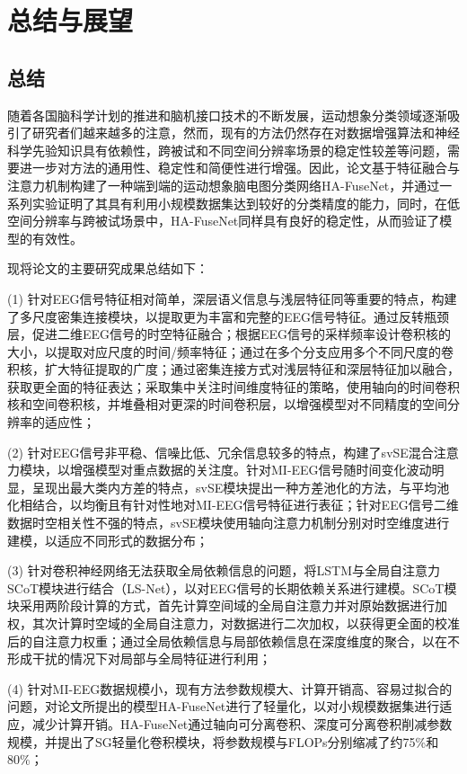 
\chapter{总结与展望}

\section{总结}

随着各国脑科学计划的推进和脑机接口技术的不断发展，运动想象分类领域逐渐吸引了研究者们越来越多的注意，然而，现有的方法仍然存在对数据增强算法和神经科学先验知识具有依赖性，跨被试和不同空间分辨率场景的稳定性较差等问题，需要进一步对方法的通用性、稳定性和简便性进行增强。因此，论文基于特征融合与注意力机制构建了一种端到端的运动想象脑电图分类网络HA-FuseNet，并通过一系列实验证明了其具有利用小规模数据集达到较好的分类精度的能力，同时，在低空间分辨率与跨被试场景中，HA-FuseNet同样具有良好的稳定性，从而验证了模型的有效性。

现将论文的主要研究成果总结如下：

(1) 针对EEG信号特征相对简单，深层语义信息与浅层特征同等重要的特点，构建了多尺度密集连接模块，以提取更为丰富和完整的EEG信号特征。通过反转瓶颈层，促进二维EEG信号的时空特征融合；根据EEG信号的采样频率设计卷积核的大小，以提取对应尺度的时间/频率特征；通过在多个分支应用多个不同尺度的卷积核，扩大特征提取的广度；通过密集连接方式对浅层特征和深层特征加以融合，获取更全面的特征表达；采取集中关注时间维度特征的策略，使用轴向的时间卷积核和空间卷积核，并堆叠相对更深的时间卷积层，以增强模型对不同精度的空间分辨率的适应性；

(2) 针对EEG信号非平稳、信噪比低、冗余信息较多的特点，构建了svSE混合注意力模块，以增强模型对重点数据的关注度。针对MI-EEG信号随时间变化波动明显，呈现出最大类内方差的特点\cite{mane2021fbcnet}，svSE模块提出一种方差池化的方法，与平均池化相结合，以均衡且有针对性地对MI-EEG信号特征进行表征；针对EEG信号二维数据时空相关性不强的特点，svSE模块使用轴向注意力机制分别对时空维度进行建模，以适应不同形式的数据分布；

(3) 针对卷积神经网络无法获取全局依赖信息的问题，将LSTM与全局自注意力SCoT模块进行结合（LS-Net），以对EEG信号的长期依赖关系进行建模。SCoT模块采用两阶段计算的方式，首先计算空间域的全局自注意力并对原始数据进行加权，其次计算时空域的全局自注意力，对数据进行二次加权，以获得更全面的校准后的自注意力权重；通过全局依赖信息与局部依赖信息在深度维度的聚合，以在不形成干扰的情况下对局部与全局特征进行利用；

(4) 针对MI-EEG数据规模小，现有方法参数规模大、计算开销高、容易过拟合的问题，对论文所提出的模型HA-FuseNet进行了轻量化，以对小规模数据集进行适应，减少计算开销。HA-FuseNet通过轴向可分离卷积、深度可分离卷积削减参数规模，并提出了SG轻量化卷积模块，将参数规模与FLOPs分别缩减了约75\%和80\%；

